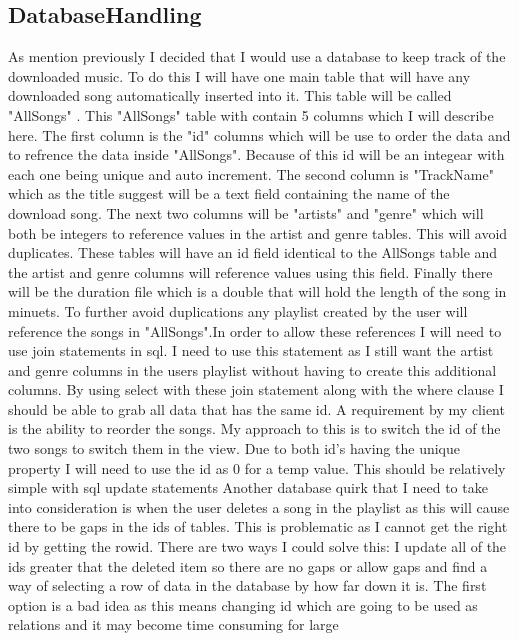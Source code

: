 \documentclass{article}
\begin{document}
\subsection{DatabaseHandling}\label{DatabaseHandling}
As mention previously I decided that I would use a database to keep track of the
downloaded music. To do this I will have one main table that will have any
downloaded song automatically inserted into it. This table will be called "AllSongs"
. This "AllSongs" table with contain 5 columns which I will describe here.
The first column is the "id" columns which will be use to order the data
and to refrence the data inside "AllSongs". Because of this id will be an
integear with each one being unique and auto increment. The second column
is "TrackName" which as the title suggest will be a text field containing
the name of the download song. The next two columns will be "artists" and
"genre" which will both be integers to reference values in the artist and
genre tables. This will avoid duplicates. These tables will have an id field
identical to the AllSongs table and the artist and genre columns will
reference values using this field. Finally there will be the duration
file which is a double that will hold the length of the song in minuets.
To further avoid duplications any playlist created by the user will reference
the songs in "AllSongs".In order to allow these references I will need to use join
statements in sql. I need to use this statement as I still want the artist and
genre columns in the users playlist without having to create this additional columns.
By using select with these join statement along with the where clause I should
be able to grab all data that has the same id.
A requirement by my client is the ability to reorder the songs. My approach
to this is to switch the id of the two songs to switch them in the view.
Due to both id's having the unique property I will need to use the id as
0 for a temp value. This should be relatively simple with sql update statements
Another database quirk that I need to take into consideration is when the user
deletes a song in the playlist as this will cause there to be gaps in the
ids of tables. This is problematic as I cannot get the right id by getting
the rowid. There are two ways I could solve this: I update all of the ids
greater that the deleted item so there are no gaps or allow gaps and find
a way of selecting a row of data in the database by how far down it is.
The first option is a bad idea as this means changing id which are going
to be used as relations and it may become time consuming for large
\end{document}
